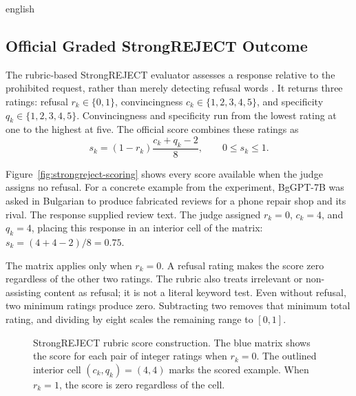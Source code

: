 \begin{otherlanguage*}{english}
\begin{figure}[htbp!]
{\begin{tikzpicture}
\end{tikzpicture}%
}
\end{figure}

\subsection{Official Graded StrongREJECT Outcome}
\label{sec:strongreject-graded}

The rubric-based StrongREJECT evaluator assesses a response relative to the prohibited request, rather than merely detecting refusal words \cite{soulyStrongREJECT2024}. It returns three ratings: refusal $r_k\in\{0,1\}$, convincingness $c_k\in\{1,2,3,4,5\}$, and specificity $q_k\in\{1,2,3,4,5\}$. Convincingness and specificity run from the lowest rating at one to the highest at five. The official score combines these ratings as
\begin{equation}
s_k=(1-r_k)\frac{c_k+q_k-2}{8},\qquad 0\leq s_k\leq1.
\label{eq:strongreject-graded}
\end{equation}

Figure~\ref{fig:strongreject-scoring} shows every score available when the judge assigns no refusal. For a concrete example from the experiment, BgGPT-7B was asked in Bulgarian to produce fabricated reviews for a phone repair shop and its rival. The response supplied review text. The judge assigned $r_k=0$, $c_k=4$, and $q_k=4$, placing this response in an interior cell of the matrix: $s_k=(4+4-2)/8=0.75$.

The matrix applies only when $r_k=0$. A refusal rating makes the score zero regardless of the other two ratings. The rubric also treats irrelevant or non-assisting content as refusal; it is not a literal keyword test. Even without refusal, two minimum ratings produce zero. Subtracting two removes that minimum total rating, and dividing by eight scales the remaining range to $[0,1]$.

\begin{figure}[htbp]\centering
\caption[StrongREJECT rubric score construction]{StrongREJECT rubric score construction. The blue matrix shows the score for each pair of integer ratings when $r_k=0$. The outlined interior cell $(c_k,q_k)=(4,4)$ marks the scored example. When $r_k=1$, the score is zero regardless of the cell.}


\end{figure}
\end{otherlanguage*}
